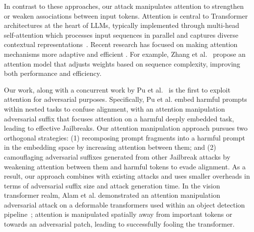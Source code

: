     
In contrast to these approaches, our attack manipulates attention to strengthen or weaken associations between input tokens.  Attention is central to Transformer architectures at the heart of LLMs, typically implemented through multi-head self-attention which processes input sequences in parallel and captures diverse contextual representations~\cite{wang2020linformer, radford2019language}.  Recent research has focused on making attention mechanisms more adaptive and efficient \cite{chen2021scatterbrain}. For example, Zhang et al.~\cite{zhang2023tell} propose an attention model that adjusts weights based on sequence complexity, improving both performance and efficiency. %

Our work, along with a concurrent work by Pu et al.~\citet{pu2024feint} is the first to exploit attention for adversarial purposes.  Specifically, Pu et al. embed harmful prompts within nested tasks to confuse alignment, with an attention manipulation adversarial suffix that focuses attention on a harmful deeply embedded task, leading to effective Jailbreaks.   Our attention manipulation approach pursues two orthogonal strategies: (1) recomposing prompt fragments into a harmful prompt in the embedding space by increasing attention between them; and (2) camouflaging adversarial suffixes generated from other Jailbreak attacks by weakening attention between them and harmful tokens to evade alignment.   As a result, our approach combines with existing attacks and uses smaller overheads in terms of adversarial suffix size and attack generation time.  In the vision transformer realm, Alam et al. demonstrated an attention manipulation adversarial attack on a deformable transformers used within an object detection pipeline~\cite{alam-23}; attention is manipulated spatially away from important tokens or towards an adversarial patch, leading to successfully fooling the transformer. %



